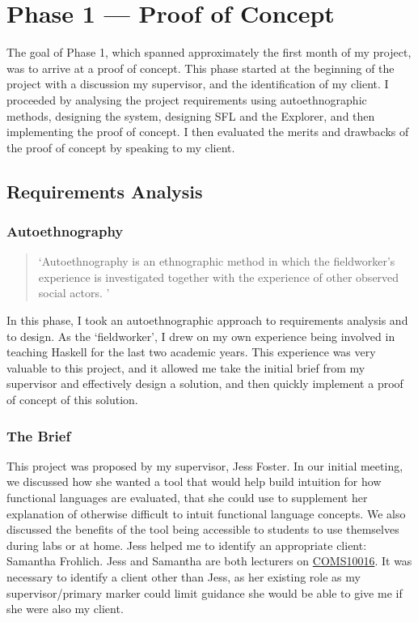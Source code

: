 \chapter{Phase 1 --- Proof of Concept}
The goal of Phase 1, which spanned approximately the first month of my project, was to arrive at a proof of concept. This phase started at the beginning of the project with a discussion my supervisor, and the identification of my client. I proceeded by analysing the project requirements using autoethnographic methods, designing the system, designing \ac{SFL} and the Explorer, and then implementing the proof of concept. I then evaluated the merits and drawbacks of the proof of concept by speaking to my client. 

\section{Requirements Analysis}
\subsection{Autoethnography}
\label{sec:c1_autoethnography}
\begin{quote}
`Autoethnography is an ethnographic method in which the fieldworker's experience is investigated together with the experience of other observed social actors. \cite{autoethnography}'
\end{quote}

\noindent In this phase, I took an autoethnographic approach to requirements analysis and to design. As the `fieldworker', I drew on my own experience being involved in teaching Haskell for the last two academic years. This experience was very valuable to this project, and it allowed me take the initial brief from my supervisor and effectively design a solution, and then quickly implement a proof of concept of this solution. 

\subsection{The Brief}
This project was proposed by my supervisor, Jess Foster. In our initial meeting, we discussed how she wanted a tool that would help build intuition for how functional languages are evaluated, that she could use to supplement her explanation of otherwise difficult to intuit functional language concepts. We also discussed the benefits of the tool being accessible to students to use themselves during labs or at home. Jess helped me to identify an appropriate client: Samantha Frohlich. Jess and Samantha are both lecturers on \hyperref[COMS10016]{COMS10016}. It was necessary to identify a client other than Jess, as her existing role as my supervisor/primary marker could limit guidance she would be able to give me if she were also my client. 

